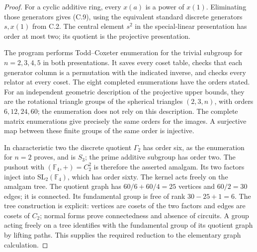 \begin{proof}
For a cyclic additive ring, every $x(a)$ is a power of $x(1)$.
Eliminating those generators gives (C.9), using the equivalent
standard discrete generators $s,x(1)$ from C.2. The central element
$s^2$ in the special-linear presentation has order at most two;
its quotient is the projective presentation.

The program performs Todd--Coxeter enumeration for the trivial
subgroup for $n=2,3,4,5$ in both presentations. It saves every
coset table, checks that each generator column is a permutation
with the indicated inverse, and checks every relator at every
coset. The eight completed enumerations have the orders stated.
For an independent geometric description of the projective upper
bounds, they are the rotational triangle groups of the spherical
triangles $(2,3,n)$, with orders $6,12,24,60$; the enumeration does
not rely on this description. The complete matrix enumerations
give precisely the same orders for the images. A surjective map
between these finite groups of the same order is injective.

In characteristic two the discrete quotient $\Gamma_2$ has order
six, as the enumeration for $n=2$ proves, and is $S_3$; the prime
additive subgroup has order two. The pushout with
$(\mathbb F_4,+)=C_2^2$ is therefore the asserted amalgam.
Its two factors inject into $\mathrm{SL}_2(\mathbb F_4)$, which
has order sixty. The kernel acts freely on the amalgam tree.
The quotient graph has $60/6+60/4=25$ vertices and $60/2=30$
edges; it is connected. Its fundamental group is free of rank
$30-25+1=6$. The tree construction is explicit: vertices are
cosets of the two factors and edges are cosets of $C_2$; normal
forms prove connectedness and absence of circuits. A group acting
freely on a tree identifies with the fundamental group of its
quotient graph by lifting paths. This supplies the required reduction
to the elementary graph calculation.


\end{proof}
